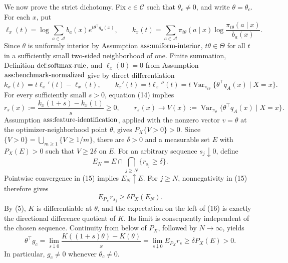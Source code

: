 We now prove the strict dichotomy.  Fix \(c\in\mathcal C\) such that \(\theta_c\neq0\), and write \(\theta=\theta_c\).  For each \(x\), put
\[
 \ell_x(t)=\log\sum_{a\in\mathcal A}b_a(x)e^{t\theta^\top q_a(x)},
 \qquad
 k_x(t)=\sum_{a\in\mathcal A}\pi_{t\theta}(a\mid x)
             \log\frac{\pi_{t\theta}(a\mid x)}{b_a(x)}.
\]
Since \(\theta\) is uniformly interior by Assumption \(\textnormal{ass:uniform-interior}\), \(t\theta\in\Theta\) for all \(t\) in a sufficiently small two-sided neighborhood of one.  Finite summation, Definition \(\textnormal{def:softmax-rule}\), and \(\ell_x(0)=0\) from Assumption \(\textnormal{ass:benchmark-normalized}\) give by direct differentiation
\[
 k_x(t)=t\ell_x'(t)-\ell_x(t),
 \qquad
 k_x'(t)=t\ell_x''(t)
 =t\operatorname{Var}_{\pi_{t\theta}}
       \{\theta^\top q_A(x)\mid X=x\}.                         \tag{14}
\]
For every sufficiently small \(s>0\), equation (14) implies
\[
 r_s(x):=\frac{k_x(1+s)-k_x(1)}{s}\geq0,
 \qquad
 r_s(x)\longrightarrow
 V(x):=\operatorname{Var}_{\pi_\theta}
       \{\theta^\top q_A(x)\mid X=x\}.                        \tag{15}
\]
Assumption \(\textnormal{ass:feature-identification}\), applied with the nonzero vector \(v=\theta\) at the optimizer-neighborhood point \(\theta\), gives \(P_X\{V>0\}>0\).  Since \(\{V>0\}=\bigcup_{m\geq1}\{V\geq1/m\}\), there are \(\delta>0\) and a measurable set \(E\) with \(P_X(E)>0\) such that \(V\geq2\delta\) on \(E\).  For an arbitrary sequence \(s_j\downarrow0\), define
\[
 E_N=E\cap\bigcap_{j\geq N}\{r_{s_j}\geq\delta\}.
\]
Pointwise convergence in (15) implies \(E_N\uparrow E\).  For \(j\geq N\), nonnegativity in (15) therefore gives
\[
 E_{P_X}r_{s_j}\geq\delta P_X(E_N).                            \tag{16}
\]
By (5), \(K\) is differentiable at \(\theta\), and the expectation on the left of (16) is exactly the directional difference quotient of \(K\).  Its limit is consequently independent of the chosen sequence.  Continuity from below of \(P_X\), followed by \(N\to\infty\), yields
\[
 \theta^\top g_c
 =\lim_{s\downarrow0}\frac{K((1+s)\theta)-K(\theta)}{s}
 =\lim_{s\downarrow0}E_{P_X}r_s
 \geq\delta P_X(E)>0.                                         \tag{17}
\]
In particular, \(g_c\neq0\) whenever \(\theta_c\neq0\).

